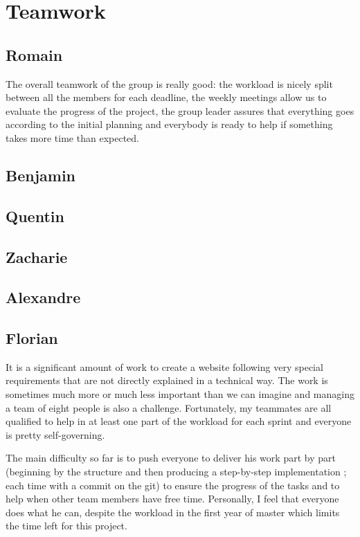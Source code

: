 \section{Teamwork}

\subsection{Romain}
The overall teamwork of the group is really good: the workload is nicely
split between all the members for each deadline, the weekly meetings allow
us to evaluate the progress of the project, the group leader assures that
everything goes according to the initial planning and everybody is ready to
help if something takes more time than expected. \newline

\subsection{Benjamin}
\subsection{Quentin}
\subsection{Zacharie}
\subsection{Alexandre}
\subsection{Florian}
It is a significant amount of work to create a website following very
special requirements that are not directly explained in a technical way.
The work is sometimes much more or much less important than we can imagine and
managing a team of eight people is also a challenge. Fortunately, my
teammates are all qualified to help in at least one part of the workload for
each sprint and everyone is pretty self-governing. \newline

The main difficulty so far is to push everyone to deliver his work part by
part (beginning by the structure and then producing a step-by-step
implementation ; each time with a commit on the git) to ensure the progress
of the tasks and to help when other team members have free time.
Personally, I feel that everyone does what he can, despite the workload in
the first year of master which limits the time left for this project.\newline
